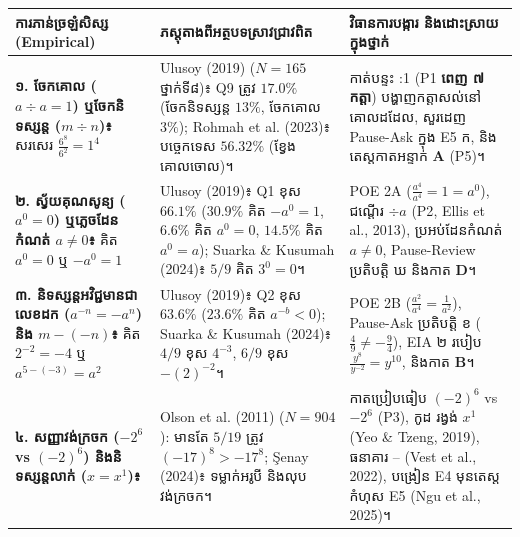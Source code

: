 \documentclass[a4paper,10pt]{article}
\renewcommand{\arraystretch}{1.08}
\newcommand{\en}[1]{{\TimesEn #1}}
\newcommand{\cnum}[1]{{\fontsize{10pt}{11.5pt}\selectfont\ding{\numexpr181+#1\relax}}}
\begin{document}
{\fontsize{8.5pt}{11.8pt}\selectfont\renewcommand{\arraystretch}{1.08}%
\begin{tabular}{|L{4.85cm}|L{5.55cm}|L{7.65cm}|}
\hline
{}
\textbf{ការភាន់ច្រឡំសិស្ស (\en{Empirical})} & \textbf{ភស្តុតាងពីអត្ថបទស្រាវជ្រាវពិត} & \textbf{វិធានការបង្ការ និងដោះស្រាយក្នុងថ្នាក់} \\
\hline
\textbf{១. ចែកគោល ($a\div a=1$) ឬចែកនិទស្សន្ត ($m\div n$)៖} សរសេរ $\frac{6^8}{6^2}=1^4$ & \en{Ulusoy (2019)} ($N=165$ ថ្នាក់ទី៨)៖ \en{Q9} ត្រូវ $17.0\%$ (ចែកនិទស្សន្ត $13\%$, ចែកគោល $3\%$); \en{Rohmah et al. (2023)}៖ បច្ចេកទេស $56.32\%$ (ខ្វែងគោលចោល)។ & កាត់បន្ទះ \en{1:1} (\en{P1} \textbf{ពេញ ៧ កត្តា}) បង្ហាញកត្តាសល់នៅគោលដដែល, សួរដេញ \en{Pause-Ask} ក្នុង \en{E5} ក, និងតេស្តកាតអន្ទាក់ \textbf{\en{A}} (\en{P5})។ \\
\hline
\textbf{២. ស្វ័យគុណសូន្យ ($a^0=0$) ឬភ្លេចដែនកំណត់ $a\neq 0$៖} គិត $a^0=0$ ឬ $-a^0=1$ & \en{Ulusoy (2019)}៖ \en{Q1} ខុស $66.1\%$ ($30.9\%$ គិត $-a^0=1$, $6.6\%$ គិត $a^0=0$, $14.5\%$ គិត $a^0=a$); \en{Suarka \& Kusumah (2024)}៖ $5/9$ គិត $3^0=0$។ & \en{POE 2A} ($\frac{a^4}{a^4}=1=a^0$), ជណ្ដើរ $\div a$ (\en{P2}, \en{Ellis et al., 2013}), ប្រអប់ដែនកំណត់ $a\neq 0$, \en{Pause-Review} ប្រតិបត្តិ ឃ និងកាត \textbf{\en{D}}។ \\
\hline
\textbf{៣. និទស្សន្តអវិជ្ជមានជាលេខដក ($a^{-n}=-a^n$) និង $m-(-n)$៖} គិត $2^{-2}=-4$ ឬ $a^{5-(-3)}=a^2$ & \en{Ulusoy (2019)}៖ \en{Q2} ខុស $63.6\%$ ($23.6\%$ គិត $a^{-b}<0$); \en{Suarka \& Kusumah (2024)}៖ $4/9$ ខុស $4^{-3}$, $6/9$ ខុស $-(2)^{-2}$។ & \en{POE 2B} ($\frac{a^2}{a^4}=\frac{1}{a^2}$), \en{Pause-Ask} ប្រតិបត្តិ ខ ($\frac{4}{9}\neq -\frac{9}{4}$), \en{EIA} ២ របៀប $\frac{y^8}{y^{-2}}=y^{10}$, និងកាត \textbf{\en{B}}។ \\
\hline
\textbf{៤. សញ្ញាវង់ក្រចក ($-2^6$ vs $(-2)^6$) និងនិទស្សន្តលាក់ ($x=x^1$)៖} & \en{Olson et al. (2011)} ($N=904$): មានតែ $5/19$ ត្រូវ $(-17)^8>-17^8$; \en{Şenay (2024)}៖ ទម្លាក់អរូបី និងលុបវង់ក្រចក។ & កាតប្រៀបធៀប $(-2)^6$ vs $-2^6$ (\en{P3}), កូដ \en{[tracing]} រង្វង់ $x^{\boxed{1}}$ (\en{Yeo \& Tzeng, 2019}), ធនាគារ \cnum{1}--\cnum{5} (\en{Vest et al., 2022}), បង្រៀន \en{E4} មុនតេស្តកំហុស \en{E5} (\en{Ngu et al., 2025})។ \\
\hline
\end{tabular}}
\end{document}
